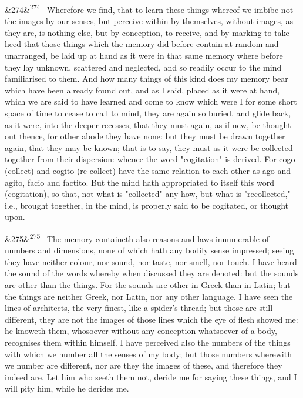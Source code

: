 \documentclass[12pt]{article}
\newcommand{\para}[1][]{\par\noindent\ifx&#1&\else\textsuperscript{\footnotesize #1}~\fi}
\begin{document}
\para[274] Wherefore we find, that to learn these things whereof we imbibe not the images by our senses, but perceive within by themselves, without images, as they are, is nothing else, but by conception, to receive, and by marking to take heed that those things which the memory did before contain at random and unarranged, be laid up at hand as it were in that same memory where before they lay unknown, scattered and neglected, and so readily occur to the mind familiarised to them. And how many things of this kind does my memory bear which have been already found out, and as I said, placed as it were at hand, which we are said to have learned and come to know which were I for some short space of time to cease to call to mind, they are again so buried, and glide back, as it were, into the deeper recesses, that they must again, as if new, be thought out thence, for other abode they have none: but they must be drawn together again, that they may be known; that is to say, they must as it were be collected together from their dispersion: whence the word "cogitation" is derived. For cogo (collect) and cogito (re-collect) have the same relation to each other as ago and agito, facio and factito. But the mind hath appropriated to itself this word (cogitation), so that, not what is "collected" any how, but what is "recollected," i.e., brought together, in the mind, is properly said to be cogitated, or thought upon.

\para[275] The memory containeth also reasons and laws innumerable of numbers and dimensions, none of which hath any bodily sense impressed; seeing they have neither colour, nor sound, nor taste, nor smell, nor touch. I have heard the sound of the words whereby when discussed they are denoted: but the sounds are other than the things. For the sounds are other in Greek than in Latin; but the things are neither Greek, nor Latin, nor any other language. I have seen the lines of architects, the very finest, like a spider's thread; but those are still different, they are not the images of those lines which the eye of flesh showed me: he knoweth them, whosoever without any conception whatsoever of a body, recognises them within himself. I have perceived also the numbers of the things with which we number all the senses of my body; but those numbers wherewith we number are different, nor are they the images of these, and therefore they indeed are. Let him who seeth them not, deride me for saying these things, and I will pity him, while he derides me.
\end{document}
